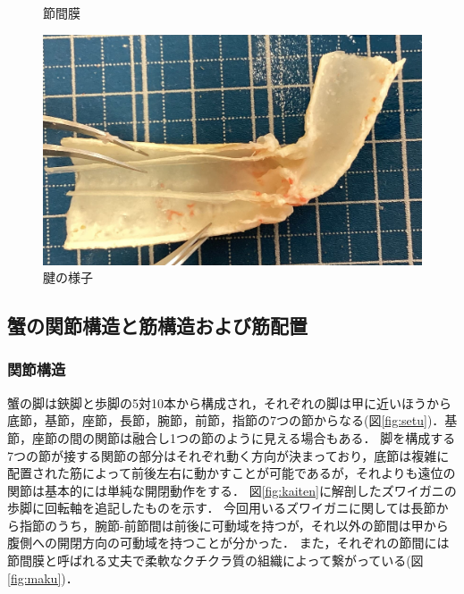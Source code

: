 \begin{figure}[t]
\begin{minipage}{0.5\hsize}
    \caption{節間膜}
    \label{fig:maku}
  \end{minipage}
%
    \begin{minipage}{0.5\hsize}
      \centering
      \vspace{4mm}
      \includegraphics[scale=0.1]{image/setukanmaku.jpg}
      \caption{腱の様子}
      \label{fig:ken}
    \end{minipage}
  \end{figure}
\vspace{15mm}
\subsection{蟹の関節構造と筋構造および筋配置}
\subsubsection{関節構造}
蟹の脚は鋏脚と歩脚の5対10本から構成され，それぞれの脚は甲に近いほうから底節，基節，座節，長節，腕節，前節，指節の7つの節からなる(図\ref{fig:setu})．基節，座節の間の関節は融合し1つの節のように見える場合もある\cite{crabnature}．
脚を構成する7つの節が接する関節の部分はそれぞれ動く方向が決まっており，底節は複雑に配置された筋によって前後左右に動かすことが可能であるが，それよりも遠位の関節は基本的には単純な開閉動作をする．
図\ref{fig:kaiten}に解剖したズワイガニの歩脚に回転軸を追記したものを示す．
今回用いるズワイガニに関しては長節から指節のうち，腕節-前節間は前後に可動域を持つが，それ以外の節間は甲から腹側への開閉方向の可動域を持つことが分かった．
また，それぞれの節間には節間膜と呼ばれる丈夫で柔軟なクチクラ質の組織によって繋がっている(図\ref{fig:maku})．
